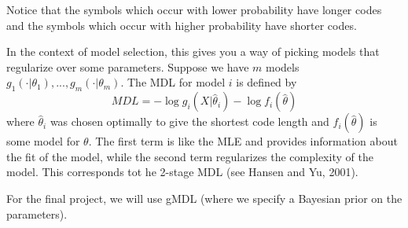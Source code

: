Notice that the symbols which occur with lower probability have longer codes and the symbols which occur with higher probability have shorter codes.

In the context of model selection, this gives you a way of picking models that regularize over some parameters. Suppose we have $m$ models $g_1(\cdot | \theta_1), ..., g_m(\cdot | \theta_m)$. The MDL for model $i$ is defined by
$$MDL = - \log g_i(X|\hat{\theta}_i) - \log f_i(\hat{\theta})$$
where $\hat{\theta}_i$ was chosen optimally to give the shortest code length and $f_i(\hat{\theta})$ is some model for $\theta$. The first term is like the MLE and provides information about the fit of the model, while the second term regularizes the complexity of the model. This corresponds tot he 2-stage MDL (see Hansen and Yu, 2001).

For the final project, we will use gMDL (where we specify a Bayesian prior on the parameters).
